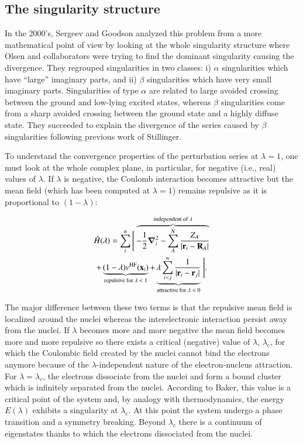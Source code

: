 \documentclass[aps,prb,reprint,noshowkeys,superscriptaddress]{revtex4-1}
\newcommand{\latin}[1]{#1}
\newcommand{\ie}{\latin{i.e.}}
\newcommand{\hH}{\Hat{H}}
\begin{document}
\subsection{The singularity structure}
In the 2000's, Sergeev and Goodson \cite{Sergeev_2005, Sergeev_2006} analyzed this problem from a more mathematical point of view by looking at the whole singularity structure where Olsen and collaborators were trying to find the dominant singularity causing the divergence. They regrouped singularities in two classes: i) $\alpha$ singularities which have ``large'' imaginary parts, and ii) $\beta$ singularities which have very small imaginary parts. Singularities of type $\alpha$ are related to large avoided crossing between the ground and low-lying excited states, whereas $\beta$ singularities come from a sharp avoided crossing between the ground state and a highly diffuse state. They succeeded to explain the divergence of the series caused by $\beta$ singularities following previous work of Stillinger. \cite{Stillinger_2000}

To understand the convergence properties of the perturbation series at $\lambda=1$, one must look at the whole complex plane, in particular, for negative (\ie, real) values of $\lambda$. If $\lambda$ is negative, the Coulomb interaction becomes attractive but the mean field (which has been computed at $\lambda = 1$) remains repulsive as it is proportional to $(1-\lambda)$:

\begin{multline}
\label{eq:HamiltonianStillinger}
    \hH(\lambda) = 
    \sum_{i}^{n} \Bigg[ 
    \overbrace{-\frac{1}{2}\grad_i^2 
    - \sum_{A}^{N} \frac{Z_A}{\abs{\vb{r}_i-\vb{R}_A}}}^{\text{independent of $\lambda$}}
    \\
    + \underbrace{(1-\lambda)v^{\text{HF}}(\vb{x}_i)}_{\text{repulsive for $\lambda < 1$}}
    + \underbrace{\lambda\sum_{i<j}^{n}\frac{1}{|\vb{r}_i-\vb{r}_j|}}_{\text{attractive for $\lambda < 0$}}
    \Bigg].
\end{multline}

The major difference between these two terms is that the repulsive mean field is localized around the nuclei whereas the interelectronic interaction persist away from the nuclei. If $\lambda$ becomes more and more negative the mean field becomes more and more repulsive so there exists a critical (negative) value of $\lambda$, $\lambda_\text{c}$, for which the Coulombic field created by the nuclei cannot bind the electrons anymore because of the $\lambda$-independent nature of the electron-nucleus attraction. For $\lambda = \lambda_c$, the electrons dissociate from the nuclei and form a bound cluster which is infinitely separated from the nuclei. According to Baker, \cite{Baker_1971} this value is a critical point of the system and, by analogy with thermodynamics, the energy $E(\lambda)$ exhibits a singularity at $\lambda_\text{c}$. At this point the system undergo a phase transition and a symmetry breaking. 
Beyond $\lambda_c$ there is a continuum of eigenstates thanks to which the electrons dissociated from the nuclei.
\end{document}
